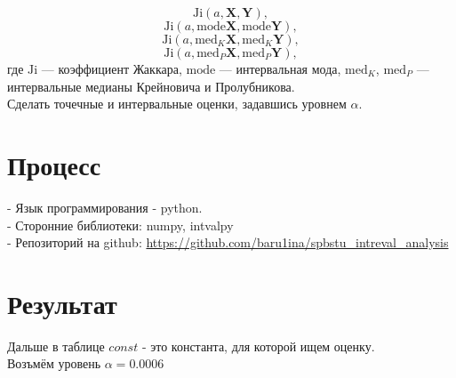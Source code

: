 \documentclass[10pt]{article}
\begin{document}
  \begin{equation} \label{eq:F_1}
    \text{Ji} (a, \mathbf{X}, \mathbf{Y}),
  \end{equation}
  \begin{equation} \label{eq:F_2}
    \text{Ji} (a, \text{mode} \mathbf{X}, \text{mode} \mathbf{Y}),
  \end{equation}
  \begin{equation} \label{eq:F_3}
    \text{Ji} (a, \text{med}_K \mathbf{X}, \text{med}_K \mathbf{Y}),
  \end{equation}
  \begin{equation} \label{eq:F_4}
    \text{Ji} (a, \text{med}_P \mathbf{X}, \text{med}_P \mathbf{Y}),
  \end{equation}
где \( \text{Ji} \) --- коэффициент Жаккара, \( \text{mode} \) --- интервальная мода, \( \text{med}_K \), \( \text{med}_P \) --- интервальные медианы Крейновича и Пролубникова.\\
Сделать точечные и интервальные оценки, задавшись уровнем \( \alpha \). 


\section{Процесс}
- Язык программирования - python.\\
- Сторонние библиотеки: numpy, intvalpy \\
- Репозиторий на github: \url{https://github.com/baru1ina/spbstu_intreval_analysis}\\


\section{Результат}
Дальше в таблице $const$ - это константа, для которой ищем оценку.\\
Возъмём уровень $\alpha=0.0006$
 
\end{document}

